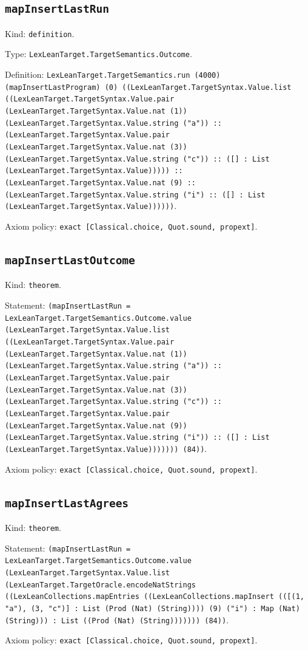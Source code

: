 \documentclass[11pt]{article}
\begin{document}
\subsection*{\texttt{mapInsertLastRun}}
\noindent Kind: \texttt{definition}.\par
\noindent Type: \texttt{LexLeanTarget.TargetSemantics.Outcome}.\par
\noindent Definition: \texttt{LexLeanTarget.TargetSemantics.run (4000) (mapInsertLastProgram) (0) ((LexLeanTarget.TargetSyntax.Value.list ((LexLeanTarget.TargetSyntax.Value.pair (LexLeanTarget.TargetSyntax.Value.nat (1)) (LexLeanTarget.TargetSyntax.Value.string ("a")) :: (LexLeanTarget.TargetSyntax.Value.pair (LexLeanTarget.TargetSyntax.Value.nat (3)) (LexLeanTarget.TargetSyntax.Value.string ("c")) :: ([] : List (LexLeanTarget.TargetSyntax.Value))))) :: (LexLeanTarget.TargetSyntax.Value.nat (9) :: (LexLeanTarget.TargetSyntax.Value.string ("i") :: ([] : List (LexLeanTarget.TargetSyntax.Value))))))}.\par
\noindent Axiom policy: \texttt{exact [Classical.choice, Quot.sound, propext]}.\par
\subsection*{\texttt{mapInsertLastOutcome}}
\noindent Kind: \texttt{theorem}.\par
\noindent Statement: \texttt{(mapInsertLastRun = LexLeanTarget.TargetSemantics.Outcome.value (LexLeanTarget.TargetSyntax.Value.list ((LexLeanTarget.TargetSyntax.Value.pair (LexLeanTarget.TargetSyntax.Value.nat (1)) (LexLeanTarget.TargetSyntax.Value.string ("a")) :: (LexLeanTarget.TargetSyntax.Value.pair (LexLeanTarget.TargetSyntax.Value.nat (3)) (LexLeanTarget.TargetSyntax.Value.string ("c")) :: (LexLeanTarget.TargetSyntax.Value.pair (LexLeanTarget.TargetSyntax.Value.nat (9)) (LexLeanTarget.TargetSyntax.Value.string ("i")) :: ([] : List (LexLeanTarget.TargetSyntax.Value))))))) (84))}.\par
\noindent Axiom policy: \texttt{exact [Classical.choice, Quot.sound, propext]}.\par
\subsection*{\texttt{mapInsertLastAgrees}}
\noindent Kind: \texttt{theorem}.\par
\noindent Statement: \texttt{(mapInsertLastRun = LexLeanTarget.TargetSemantics.Outcome.value (LexLeanTarget.TargetSyntax.Value.list (LexLeanTarget.TargetOracle.encodeNatStrings ((LexLeanCollections.mapEntries ((LexLeanCollections.mapInsert (([(1, "a"), (3, "c")] : List (Prod (Nat) (String)))) (9) ("i") : Map (Nat) (String))) : List ((Prod (Nat) (String))))))) (84))}.\par
\noindent Axiom policy: \texttt{exact [Classical.choice, Quot.sound, propext]}.\par
\end{document}
